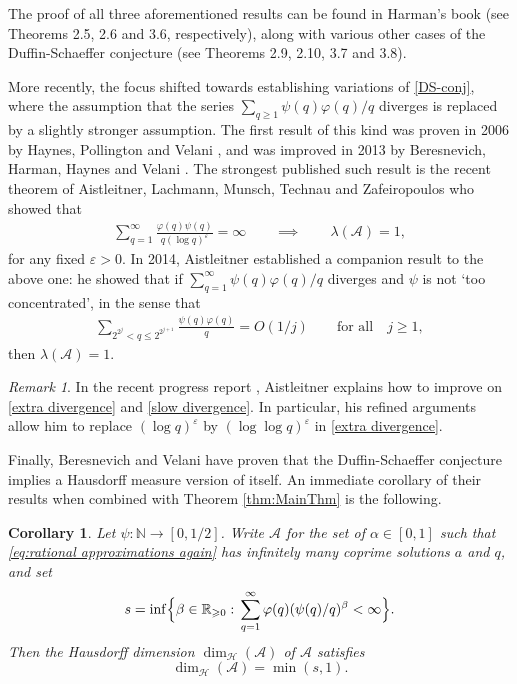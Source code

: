 \documentclass[12pt]{amsart}
\numberwithin{equation}{section}
\newtheorem{cor}[thm]{Corollary}
\theoremstyle{definition}
\theoremstyle{remark}
\newtheorem*{rem}{Remark}
\newcommand{\N}{\mathbb{N}}
\newcommand{\CA}{\mathcal{A}}
\newcommand{\CH}{\mathcal{H}}
\newcommand{\eq}[1]{ \begin{equation} \begin{split} #1 \end{split} \end{equation} }
\newcommand{\eps}{\varepsilon}
\renewcommand{\phi}{\varphi}
\renewcommand{\le}{\leqslant}
\renewcommand{\ge}{\geqslant}
\begin{document}
The proof of all three aforementioned results can be found in Harman's book \cite{harman} (see Theorems 2.5, 2.6 and  3.6, respectively), along with various other cases of the Duffin-Schaeffer conjecture (see Theorems 2.9, 2.10, 3.7 and 3.8).

More recently, the focus shifted towards establishing variations of \eqref{DS-conj}, where the assumption that the series $\sum_{q\ge1}\psi(q)\phi(q)/q$ diverges is replaced by a slightly stronger assumption. The first result of this kind was proven in 2006 by Haynes,  Pollington and Velani \cite{extra-div1}, and was improved in 2013 by Beresnevich, Harman, Haynes and Velani \cite{extra-div2}. The strongest published such result is the recent theorem of Aistleitner, Lachmann, Munsch, Technau and Zafeiropoulos \cite{aistleitner} who showed that 
\eq{\label{extra divergence}
\sum_{q=1}^\infty \frac{\phi(q)\psi(q)}{q(\log{q})^\eps}=\infty
\qquad\implies\qquad \lambda(\CA)=1,
}
for any fixed $\eps>0$. In 2014, Aistleitner \cite{aistleiner} established a companion result to the above one: he showed that if $\sum_{q=1}^\infty\psi(q)\phi(q)/q$ diverges and $\psi$ is not `too concentrated', in the sense that
\eq{\label{slow divergence}
\sum_{ 2^{2^j}<q\le 2^{2^{j+1}} } \frac{\psi(q)\phi(q)}{q}=O(1/j)\qquad \text{for all}\quad j\ge1 ,
}
then $\lambda(\CA)=1$. 

\begin{rem} In the recent progress report \cite{aistleitner2}, Aistleitner explains how to improve on \eqref{extra divergence} and \eqref{slow divergence}. In particular, his refined arguments allow him to replace $(\log q)^\eps$ by $(\log\log q)^\eps$ in \eqref{extra divergence}.
\end{rem} 

Finally, Beresnevich and Velani \cite{hausdorff DS} have proven that the Duffin-Schaeffer conjecture implies a Hausdorff measure version of itself. An immediate corollary of their results when combined with Theorem \ref{thm:MainThm} is the following.
\begin{cor}
Let $\psi:\N\rightarrow [0,1/2]$. Write $\CA$ for the set of $\alpha\in[0,1]$ such that \eqref{eq:rational approximations again} has infinitely many coprime solutions $a$ and $q$, and set
\[
s=\inf\Bigl\{\beta\in\mathbb{R}_{\ge 0}:\,\sum_{q=1}^\infty \phi(q)(\psi(q)/q)^\beta<\infty\Bigl\}.
\]
Then the Hausdorff dimension $\dim_{\CH}(\CA)$ of $\CA$ satisfies
\[
\dim_{\CH}(\CA)=\min(s,1).
\]
\end{cor}

\medskip
\end{document}
